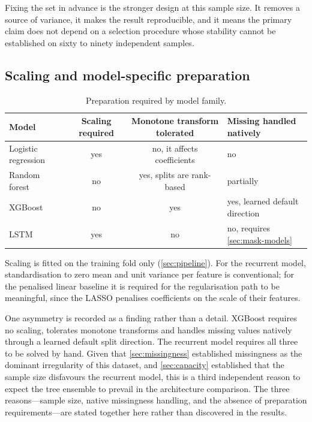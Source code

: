 \documentclass[12pt,a4paper,oneside]{report}
\begin{document}
Fixing the set in advance is the stronger design at this sample size. It removes a source of variance, it makes the result reproducible, and it means the primary claim does not depend on a selection procedure whose stability cannot be established on sixty to ninety independent samples.

\subsection{Scaling and model-specific preparation}\label{sec:scaling}

\begin{table}[htbp]
\centering\small
\caption{Preparation required by model family.}\label{tab:model-prep}
\begin{tabularx}{\textwidth}{@{}X c c X@{}}
\toprule
\textbf{Model} & \textbf{Scaling required} & \textbf{Monotone transform tolerated} & \textbf{Missing handled natively} \\
\midrule
Logistic regression & yes & no, it affects coefficients & no \\
Random forest & no & yes, splits are rank-based & partially \\
XGBoost & no & yes & yes, learned default direction \\
LSTM & yes & no & no, requires \cref{sec:mask-models} \\
\bottomrule
\end{tabularx}
\end{table}

Scaling is fitted on the training fold only (\cref{sec:pipeline}). For the recurrent model, standardisation to zero mean and unit variance per feature is conventional; for the penalised linear baseline it is required for the regularisation path to be meaningful, since the LASSO penalises coefficients on the scale of their features.

One asymmetry is recorded as a finding rather than a detail. XGBoost requires no scaling, tolerates monotone transforms and handles missing values natively through a learned default split direction. The recurrent model requires all three to be solved by hand. Given that \cref{sec:missingness} established missingness as the dominant irregularity of this dataset, and \cref{sec:capacity} established that the sample size disfavours the recurrent model, this is a third independent reason to expect the tree ensemble to prevail in the architecture comparison. The three reasons---sample size, native missingness handling, and the absence of preparation requirements---are stated together here rather than discovered in the results.
\end{document}
